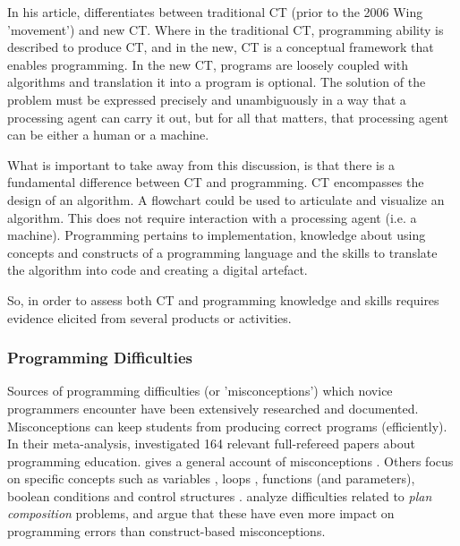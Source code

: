 In his article,  differentiates between traditional CT (prior to the 2006 Wing 'movement') and new CT. Where in the traditional CT, programming ability is described to produce CT, and in the new, CT is a conceptual framework that enables programming. In the new CT, programs are loosely coupled with algorithms and translation it into a program is optional. The solution of the problem must be expressed precisely and unambiguously in a way that a processing agent can carry it out, but for all that matters, that processing agent can be either a human or a machine\cite{corradini2017conceptions}.

What is important to take away from this discussion, is that there is a fundamental difference between CT and programming. CT encompasses the design of an algorithm. A flowchart could be used to articulate and visualize an algorithm. This does not require interaction with a processing agent (i.e. a machine). Programming pertains to implementation, knowledge about using concepts and constructs of a programming language and the skills to translate the algorithm into code and creating a digital artefact.

So, in order to assess both CT and programming knowledge and skills requires evidence elicited from several products or activities.


\subsubsection{Programming Difficulties}
Sources of programming difficulties (or 'misconceptions') which novice programmers encounter have been extensively researched and documented. Misconceptions can keep students from producing correct programs (efficiently). In their meta-analysis,  investigated 164 relevant full-refereed papers about programming education. \citeauthor{robins2003learning} gives a general account of misconceptions \cite{robins2003learning}. Others focus on specific concepts such as variables \cite{Kuittinen2004}, loops \cite{Dancik2003}, functions (and parameters)\cite{sorva2012misconceptions}, boolean conditions and control structures \cite{Almstrum1999, Herman2010}.  analyze difficulties related to \emph{plan composition} problems, and argue that these have even more impact on programming errors than construct-based misconceptions.


